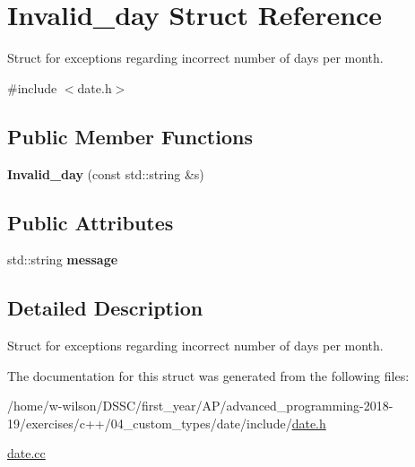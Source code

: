 \hypertarget{struct_invalid__day}{}\section{Invalid\+\_\+day Struct Reference}
\label{struct_invalid__day}


Struct for exceptions regarding incorrect number of days per month.  




{\ttfamily \#include $<$date.\+h$>$}

\subsection*{Public Member Functions}
\begin{DoxyCompactItemize}
\item 
\mbox{\label{struct_invalid__day_a27d2655de2518653ecf8b6e54505f3c8}} 
{\bfseries Invalid\+\_\+day} (const std\+::string \&s)
\end{DoxyCompactItemize}
\subsection*{Public Attributes}
\begin{DoxyCompactItemize}
\item 
\mbox{\label{struct_invalid__day_a2c5d881f7f92a74c8f323350271f5ecb}} 
std\+::string {\bfseries message}
\end{DoxyCompactItemize}


\subsection{Detailed Description}
Struct for exceptions regarding incorrect number of days per month. 

The documentation for this struct was generated from the following files\+:\begin{DoxyCompactItemize}
\item 
/home/w-\/wilson/\+D\+S\+S\+C/first\+\_\+year/\+A\+P/advanced\+\_\+programming-\/2018-\/19/exercises/c++/04\+\_\+custom\+\_\+types/date/include/\hyperlink{date_8h}{date.\+h}\item 
\hyperlink{date_8cc}{date.\+cc}\end{DoxyCompactItemize}
